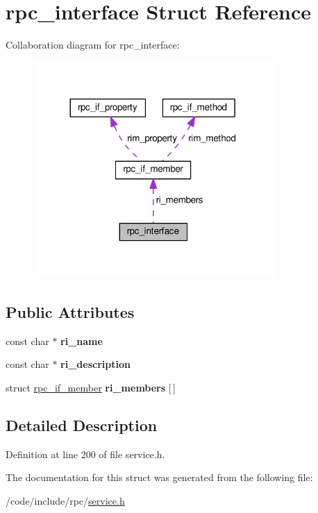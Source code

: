 \hypertarget{structrpc__interface}{}\section{rpc\+\_\+interface Struct Reference}
\label{structrpc__interface}


Collaboration diagram for rpc\+\_\+interface\+:
\nopagebreak
\begin{figure}[H]
\begin{center}
\leavevmode
\includegraphics[width=260pt]{structrpc__interface__coll__graph}
\end{center}
\end{figure}
\subsection*{Public Attributes}
\begin{DoxyCompactItemize}
\item 
const char $\ast$ {\bfseries ri\+\_\+name}\hypertarget{structrpc__interface_a7e1b33ccc8a32e6daaf69ec6daec7bc1}{}\label{structrpc__interface_a7e1b33ccc8a32e6daaf69ec6daec7bc1}

\item 
const char $\ast$ {\bfseries ri\+\_\+description}\hypertarget{structrpc__interface_a851f0bfb495af801a2958fef34596e6a}{}\label{structrpc__interface_a851f0bfb495af801a2958fef34596e6a}

\item 
struct \hyperlink{structrpc__if__member}{rpc\+\_\+if\+\_\+member} {\bfseries ri\+\_\+members} \mbox{[}$\,$\mbox{]}\hypertarget{structrpc__interface_af28bb2a8e330bb25c2c7e681cd2f7356}{}\label{structrpc__interface_af28bb2a8e330bb25c2c7e681cd2f7356}

\end{DoxyCompactItemize}


\subsection{Detailed Description}


Definition at line 200 of file service.\+h.



The documentation for this struct was generated from the following file\+:\begin{DoxyCompactItemize}
\item 
/code/include/rpc/\hyperlink{service_8h}{service.\+h}\end{DoxyCompactItemize}
